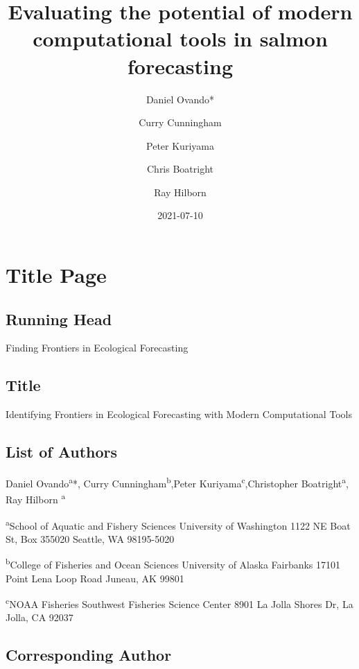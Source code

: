 \documentclass[
]{article}
\title{Evaluating the potential of modern computational tools in salmon forecasting}
\author{Daniel Ovando* \and Curry Cunningham \and Peter Kuriyama \and Chris Boatright \and Ray Hilborn}
\date{2021-07-10}
\begin{document}
\maketitle

\newpage

\hypertarget{title-page}{%
\section*{Title Page}\label{title-page}}

\hypertarget{running-head}{%
\subsection*{Running Head}\label{running-head}}

Finding Frontiers in Ecological Forecasting

\hypertarget{title}{%
\subsection*{Title}\label{title}}

Identifying Frontiers in Ecological Forecasting with Modern Computational Tools

\hypertarget{list-of-authors}{%
\subsection*{List of Authors}\label{list-of-authors}}

Daniel Ovando\textsuperscript{a}*, Curry Cunningham\textsuperscript{b},Peter Kuriyama\textsuperscript{c},Christopher Boatright\textsuperscript{a}, Ray Hilborn \textsuperscript{a}

\textsuperscript{a}School of Aquatic and Fishery Sciences University of Washington 1122 NE Boat St, Box 355020 Seattle, WA 98195-5020

\textsuperscript{b}College of Fisheries and Ocean Sciences University of Alaska Fairbanks 17101 Point Lena Loop Road Juneau, AK 99801

\textsuperscript{c}NOAA Fisheries Southwest Fisheries Science Center 8901 La Jolla Shores Dr, La Jolla, CA 92037

\hypertarget{corresponding-author}{%
\subsection*{Corresponding Author}\label{corresponding-author}}
\end{document}

